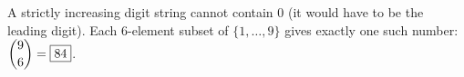 A strictly increasing digit string cannot contain $0$ (it would have to be the leading digit). Each $6$-element subset of $\{1,\dots,9\}$ gives exactly one such number: $\dbinom96=\boxed{84}$.
